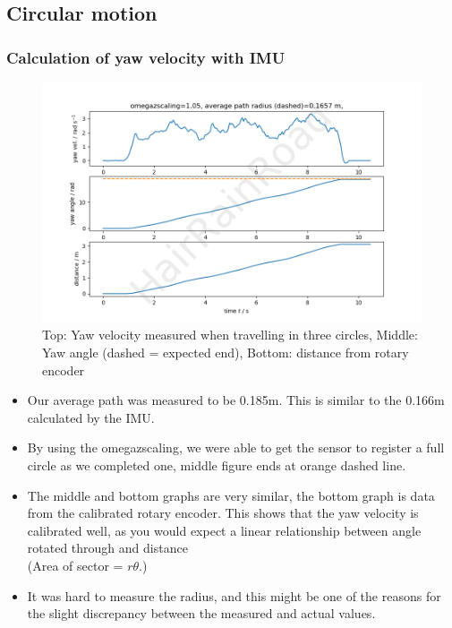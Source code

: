 \documentclass[12pt]{article}
\begin{document}
    \subsection{Circular motion}
    \subsubsection{Calculation of yaw velocity with IMU}
    \begin{figure}[H]
        \captionsetup{labelfont=bf}
        \includegraphics[width=40pc]{fig4png.png}
        \caption{Top: Yaw velocity measured when travelling in three circles, Middle: Yaw angle (dashed = expected end), Bottom: distance from rotary encoder}\label{figure4}
    \end{figure}
    \begin{itemize}
        \item Our average path was measured to be 0.185m. This is similar to the 0.166m calculated by the IMU.
        \item By using the omegazscaling, we were able to get the sensor to register a full circle as we completed one,
        middle figure ends at orange dashed line. 
        \item The middle and bottom graphs are very similar, the bottom graph is data from the calibrated rotary encoder.
        This shows that the yaw velocity is calibrated well, as you would expect a linear relationship between angle rotated through and distance
        \\ (Area of sector = $r \theta$.)
        \item It was hard to measure the radius, and this might be one of the reasons for the slight discrepancy between the measured and actual
        values. 
    \end{itemize}
    \newpage
\end{document}
